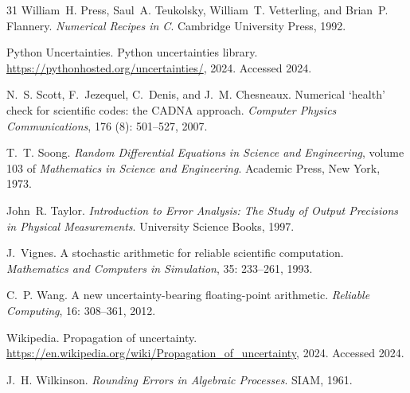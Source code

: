 \documentclass[twoside]{article}
\numberwithin{equation}{section}
\begin{document}
\begin{thebibliography}{31}
William~H. Press, Saul~A. Teukolsky, William~T. Vetterling, and Brian~P.
  Flannery.
\newblock \emph{Numerical Recipes in {C}}.
\newblock Cambridge University Press, 1992.

{Python Uncertainties}.
\newblock Python uncertainties library.
\newblock \url{https://pythonhosted.org/uncertainties/}, 2024.
\newblock Accessed 2024.

N.~S. Scott, F.~Jezequel, C.~Denis, and J.~M. Chesneaux.
\newblock Numerical `health' check for scientific codes: the {CADNA} approach.
\newblock \emph{Computer Physics Communications}, 176 (8):
  501--527, 2007.

T.~T. Soong.
\newblock \emph{Random Differential Equations in Science and Engineering},
  volume 103 of \emph{Mathematics in Science and Engineering}.
\newblock Academic Press, New York, 1973.

John~R. Taylor.
\newblock \emph{Introduction to Error Analysis: The Study of Output Precisions
  in Physical Measurements}.
\newblock University Science Books, 1997.

J.~Vignes.
\newblock A stochastic arithmetic for reliable scientific computation.
\newblock \emph{Mathematics and Computers in Simulation}, 35:
  233--261, 1993.

C.~P. Wang.
\newblock A new uncertainty-bearing floating-point arithmetic.
\newblock \emph{Reliable Computing}, 16: 308--361, 2012.

{Wikipedia}.
\newblock Propagation of uncertainty.
\newblock \url{https://en.wikipedia.org/wiki/Propagation_of_uncertainty}, 2024.
\newblock Accessed 2024.

J.~H. Wilkinson.
\newblock \emph{Rounding Errors in Algebraic Processes}.
\newblock SIAM, 1961.

\end{thebibliography}

\else


\fi
\end{document}
